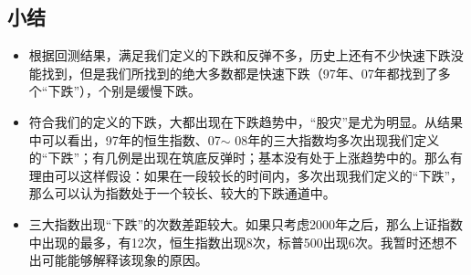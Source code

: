 \documentclass[12pt,a4paper]{article}
\begin{document}
\subsection{小结}

	\begin{itemize}
		\item 根据回测结果，满足我们定义的下跌和反弹不多，历史上还有不少快速下跌没能找到，但是我们所找到的绝大多数都是快速下跌（97年、07年都找到了多个“下跌”），个别是缓慢下跌。
		\item 符合我们的定义的下跌，大都出现在下跌趋势中，“股灾”是尤为明显。从结果中可以看出，97年的恒生指数、07$\sim$ 08年的三大指数均多次出现我们定义的“下跌”；有几例是出现在筑底反弹时；基本没有处于上涨趋势中的。那么有理由可以这样假设：如果在一段较长的时间内，多次出现我们定义的“下跌”，那么可以认为指数处于一个较长、较大的下跌通道中。
		\item 三大指数出现“下跌”的次数差距较大。如果只考虑2000年之后，那么上证指数中出现的最多，有12次，恒生指数出现8次，标普500出现6次。我暂时还想不出可能能够解释该现象的原因。
	\end{itemize}
\end{document}
